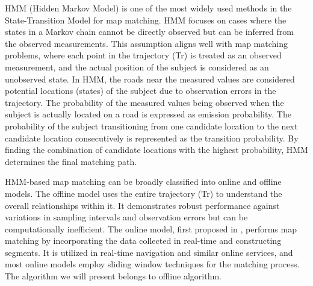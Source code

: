 \documentclass[preprint,12pt]{elsarticle}
\begin{document}
HMM (Hidden Markov Model) is one of the most widely used methods in the State-Transition Model for map matching. HMM focuses on cases where the states in a Markov chain cannot be directly observed but can be inferred from the observed measurements. This assumption aligns well with map matching problems, where each point in the trajectory (Tr) is treated as an observed measurement, and the actual position of the subject is considered as an unobserved state.
In HMM, the roads near the measured values are considered potential locations (states) of the subject due to observation errors in the trajectory. The probability of the measured values being observed when the subject is actually located on a road is expressed as emission probability. The probability of the subject transitioning from one candidate location to the next candidate location consecutively is represented as the transition probability. By finding the combination of candidate locations with the highest probability, HMM determines the final matching path.

HMM-based map matching can be broadly classified into online and offline models. The offline model uses the entire trajectory (Tr) to understand the overall relationships within it. It demonstrates robust performance against variations in sampling intervals and observation errors but can be computationally inefficient. The online model, first proposed in \cite{goh2012online}, performs map matching by incorporating the data collected in real-time and constructing segments. It is utilized in real-time navigation and similar online services, and most online models employ sliding window techniques for the matching process. The algorithm we will present belongs to offline algorithm.
\end{document}
